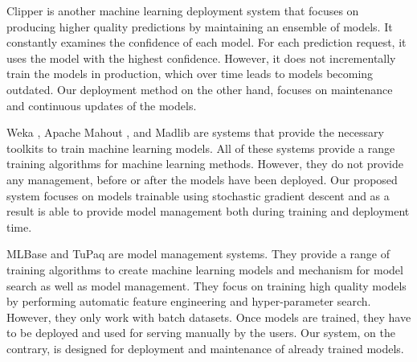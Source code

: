 \documentclass[10pt,conference,letterpaper]{IEEEtran}
\begin{document}
Clipper \cite{crankshaw2016clipper} is another machine learning deployment system that focuses on producing higher quality predictions by maintaining an ensemble of models.
It constantly examines the confidence of each model.
For each prediction request, it uses the model with the highest confidence.
However, it does not incrementally train the models in production, which over time leads to models becoming outdated.
Our deployment method on the other hand, focuses on maintenance and continuous updates of the models.

Weka \cite{hall2009weka}, Apache Mahout \cite{Owen:2011:MA:2132656}, and Madlib \cite{hellerstein2012madlib} are systems that provide the necessary toolkits to train machine learning models. 
All of these systems provide a range training algorithms for machine learning methods. 
However, they do not provide any management, before or after the models have been deployed. 
Our proposed system focuses on models trainable using stochastic gradient descent and as a result is able to provide model management both during training and deployment time.

MLBase \cite{kraska2013mlbase} and TuPaq \cite{sparks2015tupaq} are model management systems.
They provide a range of training algorithms to create machine learning models and mechanism for model search as well as model management.
They focus on training high quality models by performing automatic feature engineering and hyper-parameter search.
However, they only work with batch datasets.
Once models are trained, they have to be deployed and used for serving manually by the users.
Our system, on the contrary, is designed for deployment and maintenance of already trained models.
\end{document}
